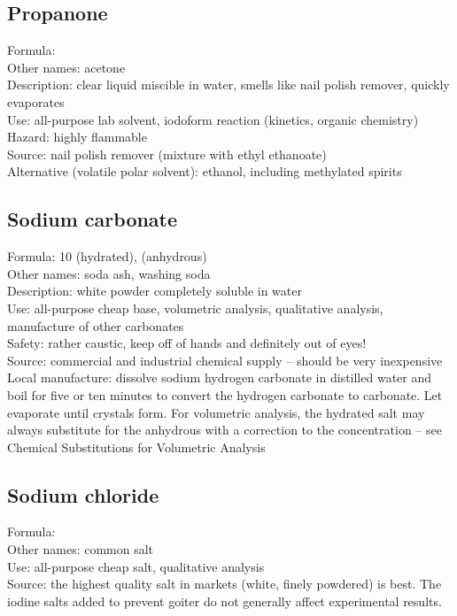 \subsection*{Propanone}
\label{sec:propanone}
Formula: \\
Other names: acetone\\
Description: clear liquid miscible in water, 
smells like nail polish remover, 
quickly evaporates\\
Use: all-purpose lab solvent, 
iodoform reaction (kinetics, organic chemistry)\\
Hazard: highly flammable\\
Source: nail polish remover (mixture with ethyl ethanoate)\\
Alternative (volatile polar solvent): ethanol, 
including methylated spirits
\subsection*{Sodium carbonate}
Formula:  10 (hydrated), 
 (anhydrous)\\
Other names: soda ash, washing soda\\
Description: white powder completely soluble in water\\
Use: all-purpose cheap base, 
volumetric analysis, 
qualitative analysis, 
manufacture of other carbonates\\
Safety: rather caustic, keep off of hands and definitely out of eyes!\\
Source: commercial and industrial chemical supply -- 
should be very inexpensive\\
Local manufacture: dissolve sodium hydrogen carbonate in distilled water 
and boil for five or ten minutes 
to convert the hydrogen carbonate to carbonate. 
Let evaporate until crystals form. 
For volumetric analysis, 
the hydrated salt may always substitute 
for the anhydrous with a correction to the concentration -- 
see Chemical Substitutions for Volumetric Analysis
\subsection*{Sodium chloride}
Formula: \\
Other names: common salt\\
Use: all-purpose cheap salt, 
qualitative analysis\\
Source: the highest quality salt in markets (white, 
finely powdered) is best. 
The iodine salts added to prevent goiter 
do not generally affect experimental results.
